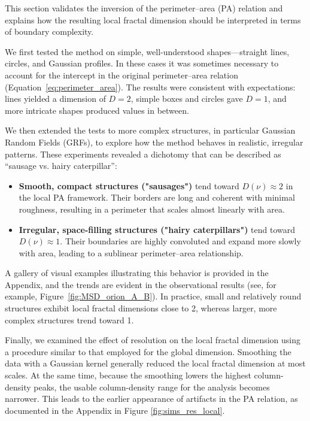 This section validates the inversion of the perimeter–area (PA) relation and explains how the resulting local fractal dimension should be interpreted in terms of boundary complexity.

We first tested the method on simple, well-understood shapes—straight lines, circles, and Gaussian profiles.  
In these cases it was sometimes necessary to account for the intercept in the original perimeter–area relation (Equation~\ref{eq:perimeter_area}).  
The results were consistent with expectations: lines yielded a dimension of \(D = 2\), simple boxes and circles gave \(D = 1\), and more intricate shapes produced values in between.

We then extended the tests to more complex structures, in particular Gaussian Random Fields (GRFs), to explore how the method behaves in realistic, irregular patterns.  
These experiments revealed a dichotomy that can be described as “sausage vs. hairy caterpillar”:
\begin{itemize}
    \item \textbf{Smooth, compact structures ("sausages")} tend toward \(D(\nu) \approx 2\) in the local PA framework. Their borders are long and coherent with minimal roughness, resulting in a perimeter that scales almost linearly with area.
    \item \textbf{Irregular, space-filling structures ("hairy caterpillars")} tend toward \(D(\nu) \approx 1\). Their boundaries are highly convoluted and expand more slowly with area, leading to a sublinear perimeter–area relationship.
\end{itemize}

A gallery of visual examples illustrating this behavior is provided in the Appendix, and the trends are evident in the observational results (see, for example, Figure~\ref{fig:MSD_orion_A_B}).  
In practice, small and relatively round structures exhibit local fractal dimensions close to 2, whereas larger, more complex structures trend toward 1.

Finally, we examined the effect of resolution on the local fractal dimension using a procedure similar to that employed for the global dimension.  
Smoothing the data with a Gaussian kernel generally reduced the local fractal dimension at most scales.  
At the same time, because the smoothing lowers the highest column-density peaks, the usable column-density range for the analysis becomes narrower.  
This leads to the earlier appearance of artifacts in the PA relation, as documented in the Appendix in Figure \ref{fig:sims_res_local}.

